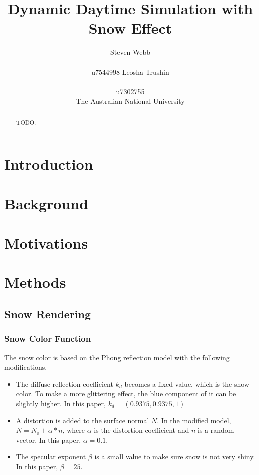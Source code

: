 \documentclass{article}
\title{Dynamic Daytime Simulation with Snow Effect}
\author{%
  Steven Webb\\\\
  u7544998 
   \And
  Leosha Trushin\\\\
  u7302755\\
  \AND  The Australian National University 
}
\begin{document}
\maketitle

\begin{abstract}
TODO:
\end{abstract}

\section{Introduction}

\section{Background}

\section{Motivations}

\section {Methods}

\subsection {Snow Rendering}

\subsubsection {Snow Color Function}
The snow color is based on the Phong reflection model with the following modifications.

\begin{itemize}
  \item The diffuse reflection coefficient \( k_d \) becomes a fixed value, which is the snow color. To make a more glittering effect, the 
  blue component of it can be slightly higher. In this paper, \( k_d = (0.9375, 0.9375, 1)\)
  \item A distortion is added to the surface normal \( N \). In the modified model, \( N = N_{o} + \alpha * n\), where \( \alpha \) is 
  the distortion coefficient and \( n \) is a random vector. In this paper, \( \alpha = 0.1\).
  \item The specular exponent \( \beta \) is a small value to make sure snow is not very shiny. In this paper, \( \beta = 25\).
\end{itemize}
\end{document}
